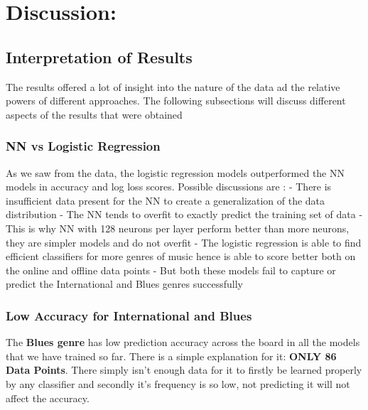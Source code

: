 \documentclass[11pt]{article}
\begin{document}
    \hypertarget{discussion}{%
\section{Discussion:}\label{discussion}}

\hypertarget{interpretation-of-results}{%
\subsection{Interpretation of Results}\label{interpretation-of-results}}

The results offered a lot of insight into the nature of the data ad the
relative powers of different approaches. The following subsections will
discuss different aspects of the results that were obtained

\hypertarget{nn-vs-logistic-regression}{%
\subsubsection{NN vs Logistic
Regression}\label{nn-vs-logistic-regression}}

As we saw from the data, the logistic regression models outperformed the
NN models in accuracy and log loss scores. Possible discussions are : -
There is insufficient data present for the NN to create a generalization
of the data distribution - The NN tends to overfit to exactly predict
the training set of data - This is why NN with 128 neurons per layer
perform better than more neurons, they are simpler models and do not
overfit - The logistic regression is able to find efficient classifiers
for more genres of music hence is able to score better both on the
online and offline data points - But both these models fail to capture
or predict the International and Blues genres successfully

\hypertarget{low-accuracy-for-international-and-blues}{%
\subsubsection{Low Accuracy for International and
Blues}\label{low-accuracy-for-international-and-blues}}

The \textbf{Blues genre} has low prediction accuracy across the board in
all the models that we have trained so far. There is a simple
explanation for it: \textbf{ONLY 86 Data Points}. There simply isn't
enough data for it to firstly be learned properly by any classifier and
secondly it's frequency is so low, not predicting it will not affect the
accuracy.
\end{document}
